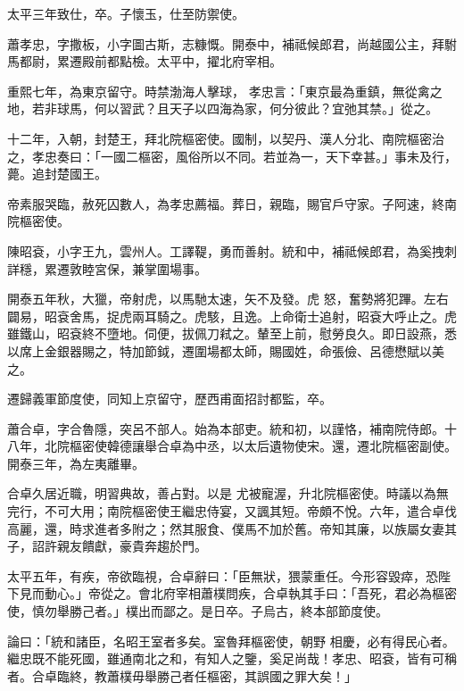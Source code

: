 \begin{pinyinscope}
 太平三年致仕，卒。子懷玉，仕至防禦使。



 蕭孝忠，字撒板，小字圖古斯，志糠慨。開泰中，補祗候郎君，尚越國公主，拜駙馬都尉，累遷殿前都點檢。太平中，擢北府宰相。



 重熙七年，為東京留守。時禁渤海人擊球，
 孝忠言：「東京最為重鎮，無從禽之地，若非球馬，何以習武？且天子以四海為家，何分彼此？宜弛其禁。」從之。



 十二年，入朝，封楚王，拜北院樞密使。國制，以契丹、漢人分北、南院樞密治之，孝忠奏曰：「一國二樞密，風俗所以不同。若並為一，天下幸甚。」事未及行，薨。追封楚國王。



 帝素服哭臨，赦死囚數人，為孝忠薦福。葬日，親臨，賜官戶守家。子阿速，終南院樞密使。



 陳昭袞，小字王九，雲州人。工譯鞮，勇而善射。統和中，補祗候郎君，為奚拽刺詳穩，累遷敦睦宮保，兼掌圍場事。



 開泰五年秋，大獵，帝射虎，以馬馳太速，矢不及發。虎
 怒，奮勢將犯蹕。左右闢易，昭袞舍馬，捉虎兩耳騎之。虎駭，且逸。上命衛士追射，昭袞大呼止之。虎雖鐵山，昭袞終不墮地。伺便，拔佩刀弒之。輦至上前，慰勞良久。即日設燕，悉以席上金銀器賜之，特加節鉞，遷圍場都太師，賜國姓，命張儉、呂德懋賦以美之。



 遷歸義軍節度使，同知上京留守，歷西甫面招討都監，卒。



 蕭合卓，字合魯隱，突呂不部人。始為本部吏。統和初，以謹恪，補南院侍郎。十八年，北院樞密使韓德讓舉合卓為中丞，以太后遺物使宋。還，遷北院樞密副使。開泰三年，為左夷離畢。



 合卓久居近職，明習典故，善占對。以是
 尤被寵渥，升北院樞密使。時議以為無完行，不可大用；南院樞密使王繼忠侍宴，又諷其短。帝頗不悅。六年，遣合卓伐高麗，還，時求進者多附之；然其服食、僕馬不加於舊。帝知其廉，以族屬女妻其子，詔許親友饋獻，豪貴奔趨於門。



 太平五年，有疾，帝欲臨視，合卓辭曰：「臣無狀，猥蒙重任。今形容毀瘁，恐陛下見而動心。」帝從之。會北府宰相蕭樸問疾，合卓執其手曰：「吾死，君必為樞密使，慎勿舉勝己者。」樸出而鄙之。是日卒。子烏古，終本部節度使。



 論曰：「統和諸臣，名昭王室者多矣。室魯拜樞密使，朝野
 相慶，必有得民心者。繼忠既不能死國，雖通南北之和，有知人之鑒，奚足尚哉！孝忠、昭袞，皆有可稱者。合卓臨終，教蕭樸毋舉勝己者任樞密，其誤國之罪大矣！」



\end{pinyinscope}